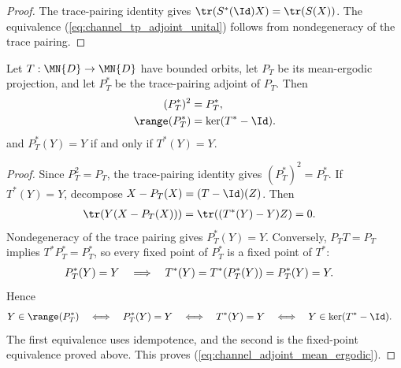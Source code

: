 \begin{proof}\leanok
    The trace-pairing identity gives
    $\tr(S^*(\Id)X)=\tr(S(X))$. The equivalence
    (\ref{eq:channel_tp_adjoint_unital}) follows from nondegeneracy of the
    trace pairing.
\end{proof}

\begin{theorem}
    \label{thm:adjoint_mean_ergodic_projection}
    \leanok
    Let $T:\MN{D}\to\MN{D}$ have bounded orbits, let $P_T$ be its
    mean-ergodic projection, and let $P_T^*$ be the trace-pairing adjoint of
    $P_T$. Then
    \begin{align}
        (P_T^*)^2     & =P_T^*, \notag  \\
        \range(P_T^*) & =\ker(T^*-\Id).
        \label{eq:channel_adjoint_mean_ergodic}
    \end{align}
    and $P_T^*(Y)=Y$ if and only if $T^*(Y)=Y$.
\end{theorem}

\begin{proof}\leanok
    Since $P_T^2=P_T$, the trace-pairing identity gives
    $(P_T^*)^2=P_T^*$. If $T^*(Y)=Y$, decompose
    $X-P_T(X)=(T-\Id)(Z)$. Then
    \begin{align}
        \tr(Y(X-P_T(X)))
         & =\tr((T^*(Y)-Y)Z)=0.
        \notag
    \end{align}
    Nondegeneracy of the trace pairing gives $P_T^*(Y)=Y$. Conversely,
    $P_TT=P_T$ implies $T^*P_T^*=P_T^*$, so every fixed point of $P_T^*$ is a
    fixed point of $T^*$:
    \begin{align}
        P_T^*(Y)=Y
         & \quad\Longrightarrow\quad
        T^*(Y)=T^*(P_T^*(Y))=P_T^*(Y)=Y.
        \notag
    \end{align}
    Hence
    \begin{align}
        Y\in\range(P_T^*)
         & \quad\Longleftrightarrow\quad P_T^*(Y)=Y
        \quad\Longleftrightarrow\quad T^*(Y)=Y
        \quad\Longleftrightarrow\quad Y\in\ker(T^*-\Id).
        \notag
    \end{align}
    The first equivalence uses idempotence, and the second is the fixed-point
    equivalence proved above. This proves
    (\ref{eq:channel_adjoint_mean_ergodic}).
\end{proof}


